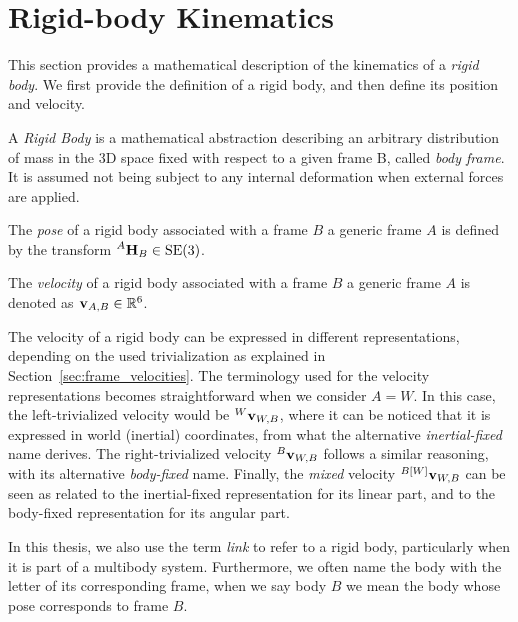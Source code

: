 \section{Rigid-body Kinematics}
\label{sec:rigid_body_kinematics}

This section provides a mathematical description of the kinematics of a \emph{rigid body}.
We first provide the definition of a rigid body, and then define its position and velocity.

\begin{definition*}
%
A \emph{Rigid Body} is a mathematical abstraction describing an arbitrary distribution of mass in the 3D space fixed with respect to a given frame B, called \emph{body frame}.
It is assumed not being subject to any internal deformation when external forces are applied.
%
\end{definition*}

\begin{definition*}
%
The \emph{pose} of a rigid body associated with a frame $B$ \wrt a generic frame $A$ is defined by the transform $\homo[A]_B \in \SE(3)$.
%
\end{definition*}

\begin{definition*}
%
The \emph{velocity} of a rigid body associated with a frame $B$ \wrt a generic frame $A$ is denoted as $\velsix_{A,B} \in \realn^6$.
%
\end{definition*}

\begin{remark*}
%
The velocity of a rigid body can be expressed in different representations, depending on the used trivialization as explained in Section~\ref{sec:frame_velocities}.
The terminology used for the velocity representations becomes straightforward when we consider $A=W$.
In this case, the left-trivialized velocity would be $\velsix[W]_{W,B}$, where it can be noticed that it is expressed in world (inertial) coordinates, from what the alternative \emph{inertial-fixed} name derives.
The right-trivialized velocity $\velsix[B]_{W,B}$ follows a similar reasoning, with its alternative \emph{body-fixed} name.
Finally, the \emph{mixed} velocity $\velsix[{B[W]}]_{W, B}$ can be seen as related to the inertial-fixed representation for its linear part, and to the body-fixed representation for its angular part.
%
\end{remark*}

\begin{remark*}[Terminology]
%
In this thesis, we also use the term \emph{link} to refer to a rigid body, particularly when it is part of a multibody system.
Furthermore, we often name the body with the letter of its corresponding frame, \ie when we say body $B$ we mean the body whose pose corresponds to frame $B$.
%
\end{remark*}


